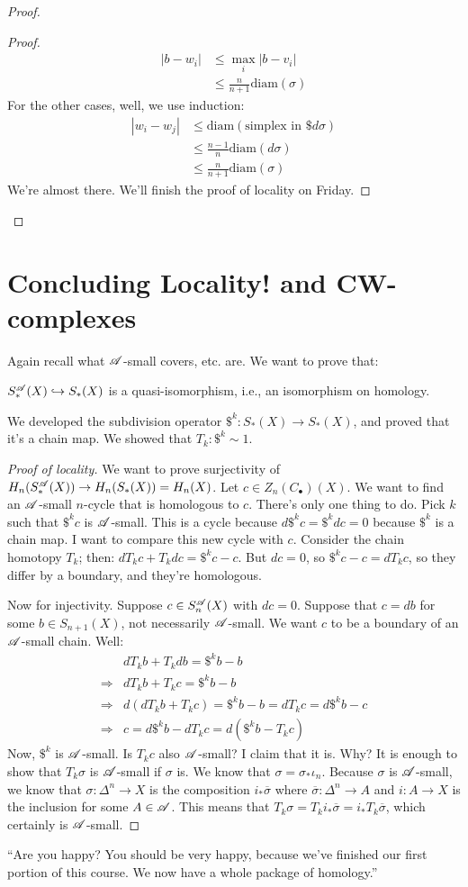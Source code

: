 \begin{proof}
\begin{proof}
\begin{align*}
|b-w_i| & \leq\max_i|b-v_i|\\
 & \leq \frac{n}{n+1}\mathrm{diam}(\sigma)
\end{align*}
For the other cases, well, we use induction:
\begin{align*}
|w_i-w_j|& \leq \mathrm{diam}(\text{simplex in }\$d\sigma)\\
& \leq \frac{n-1}{n}\mathrm{diam}(d\sigma)\\
& \leq \frac{n}{n+1}\mathrm{diam}(\sigma)
\end{align*}
We're almost there. We'll finish the proof of locality on Friday.
\end{proof}
\end{proof}
\section{Concluding Locality! and CW-complexes}
Again recall what $\mathscr{A}$-small covers, etc. are. We want to prove that:
\begin{theorem}
$S^{\mathscr{A}}_\ast(X)\hookrightarrow S_\ast(X)$ is a quasi-isomorphism, i.e., an isomorphism on homology.
\end{theorem}
We developed the subdivision operator $\$^k:S_\ast(X)\to S_\ast(X)$, and proved that it's a chain map. We showed that $T_k:\$^k\sim 1$.
\begin{proof}[Proof of locality]
We want to prove surjectivity of $ H_n(S^{\mathscr{A}}_\ast(X))\to H_n(S_\ast(X))= H_n(X)$. Let $c\in Z_n(C_\bullet)(X)$. We want to find an $\mathscr{A}$-small $n$-cycle that is homologous to $c$. There's only one thing to do. Pick $k$ such that $\$^k c$ is $\mathscr{A}$-small. This is a cycle because $d\$^k c=\$^k dc=0$ because $\$^k$ is a chain map. I want to compare this new cycle with $c$. Consider the chain homotopy $T_k$; then: $dT_k c+T_kdc=\$^kc-c$. But $dc=0$, so $\$^k c - c=dT_k c$, so they differ by a boundary, and they're homologous.

Now for injectivity. Suppose $c\in S^{\mathscr{A}}_n(X)$ with $dc=0$. Suppose that $c=db$ for some $b\in S_{n+1}(X)$, not necessarily $\mathscr{A}$-small. We want $c$ to be a boundary of an $\mathscr{A}$-small chain. Well:
\begin{align*}
& dT_kb+T_kdb=\$^k b-b\\
\Rightarrow& dT_kb+T_kc=\$^k b-b\\
\Rightarrow& d(dT_kb+T_kc)=\$^kb-b=dT_kc=d\$^k b-c\\
\Rightarrow& c=d\$^kb-dT_kc=d(\$^k b-T_kc)
\end{align*}
Now, $\$^k$ is $\mathscr{A}$-small. Is $T_kc$ also $\mathscr{A}$-small? I claim that it is. Why? It is enough to show that $T_k\sigma$ is $\mathscr{A}$-small if $\sigma$ is. We know that $\sigma=\sigma_\ast\iota_n$. Because $\sigma$ is $\mathscr{A}$-small, we know that $\sigma:\Delta^n\to X$ is the composition $i_\ast\overline{\sigma}$ where $\overline{\sigma}:\Delta^n\to A$ and $i:A\to X$ is the inclusion for some $A\in\mathscr{A}$. This means that $T_k\sigma=T_ki_\ast\overline{\sigma}=i_\ast T_k\overline{\sigma}$, which certainly is $\mathscr{A}$-small.
\end{proof}
``Are you happy? You should be very happy, because we've finished our first portion of this course. We now have a whole package of homology.''
